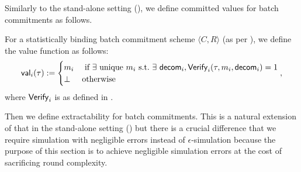 

Similarly to the stand-alone setting (), we define committed values for batch commitments as follows.  
\begin{definition}\label{def:bcom-val}
For a statistically binding batch commitment scheme $\langle C, R \rangle$ (as per ), we define the value function as follows:
\begin{equation*}
    \mathsf{val}_i(\tau):= 
    \begin{cases}
    m_i&\text{~if~}\exists\text{~unique~}m_i\text{~s.t.~}\exists~\mathsf{decom}_i, \mathsf{Verify}_i(\tau,m_i,\mathsf{decom}_i)=1\\
    \bot &\text{otherwise}
    \end{cases},
\end{equation*}
where $\mathsf{Verify}_i$ is as defined in .
\end{definition}

Then we define extractability for batch commitments. This is a natural extension of that in the stand-alone setting () but there is a crucial difference that we require simulation with negligible errors instead of $\epsilon$-simulation because the purpose of this section is to achieve negligible simulation errors at the cost of sacrificing round complexity. 

